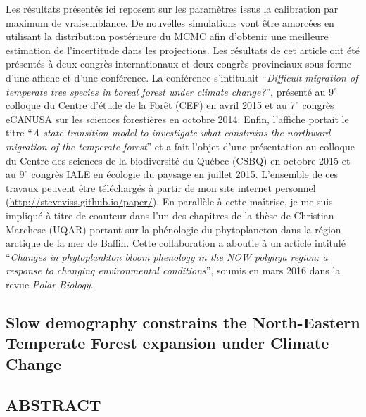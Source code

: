 Les résultats présentés ici reposent sur les paramètres issus la calibration par maximum de
vraisemblance. De nouvelles simulations vont être amorcées en utilisant la distribution postérieure
du MCMC afin d'obtenir une meilleure estimation de l'incertitude dans les projections. Les résultats
de cet article ont été présentés à deux congrès internationaux et deux congrès provinciaux sous
forme d'une affiche et d'une conférence. La conférence s'intitulait \enquote{\textit{Difficult
migration of temperate tree species in boreal forest under climate change?}}, présenté au 9$^e$
colloque du Centre d'étude de la Forêt (CEF) en avril 2015 et au 7$^e$ congrès eCANUSA sur les
sciences forestières en octobre 2014. Enfin, l'affiche portait le titre \enquote{\textit{A state
transition model to investigate what constrains the northward migration of the temperate forest}} et
a fait l'objet d'une présentation au colloque du Centre des sciences de la biodiversité du Québec
(CSBQ) en octobre 2015 et au 9$^e$ congrès IALE en écologie du paysage en juillet 2015. L'ensemble
de ces travaux peuvent être téléchargés à partir de mon site internet personnel
(\url{http://steveviss.github.io/paper/}). En parallèle à cette maîtrise, je me suis impliqué à
titre de coauteur dans l'un des chapitres de la thèse de Christian Marchese (UQAR) portant sur la
phénologie du phytoplancton dans la région arctique de la mer de Baffin. Cette collaboration a
aboutie à un article intitulé \enquote{\textit{Changes in phytoplankton bloom phenology in the NOW
polynya region: a response to changing environmental conditions}}, soumis en mars 2016 dans la revue
\textit{Polar Biology}.


\newpage

\begin{spacing}{1.0}
\section{Slow demography constrains the North-Eastern Temperate Forest expansion under Climate Change}
\end{spacing}

\subsection*{\uppercase{Abstract}}

